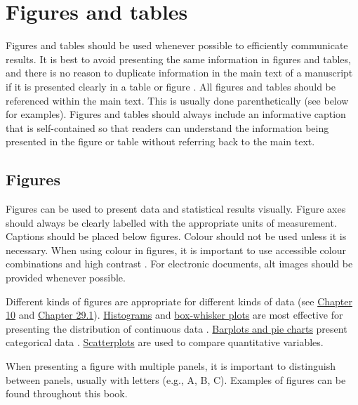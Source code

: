 \documentclass[
]{scrbook}
\begin{document}
\hypertarget{figures-and-tables}{%
\section{Figures and tables}\label{figures-and-tables}}

Figures and tables should be used whenever possible to efficiently communicate results.
It is best to avoid presenting the same information in figures and tables, and there is no reason to duplicate information in the main text of a manuscript if it is presented clearly in a table or figure \citep{Lang1997}.
All figures and tables should be referenced within the main text.
This is usually done parenthetically (see below for examples).
Figures and tables should always include an informative caption that is self-contained so that readers can understand the information being presented in the figure or table without referring back to the main text.

\hypertarget{figures}{%
\subsection{Figures}\label{figures}}

Figures can be used to present data and statistical results visually.
Figure axes should always be clearly labelled with the appropriate units of measurement.
Captions should be placed below figures.
Colour should not be used unless it is necessary.
When using colour in figures, it is important to use accessible colour combinations and high contrast \citep{Jambor2021, Painter2021}.
For electronic documents, alt images should be provided whenever possible.

Different kinds of figures are appropriate for different kinds of data (see \protect\hyperlink{Chapter_10}{Chapter 10} and \protect\hyperlink{scatterplots}{Chapter 29.1}).
\protect\hyperlink{histograms}{Histograms} and \protect\hyperlink{box-whisker-plots}{box-whisker plots} are most effective for presenting the distribution of continuous data \citep{Lang1997, Weissgerber2015}.
\protect\hyperlink{barplots-and-pie-charts}{Barplots and pie charts} present categorical data \citep{Lang1997, Weissgerber2015}.
\protect\hyperlink{scatterplots}{Scatterplots} are used to compare quantitative variables.

When presenting a figure with multiple panels, it is important to distinguish between panels, usually with letters (e.g., A, B, C).
Examples of figures can be found throughout this book.
\end{document}
